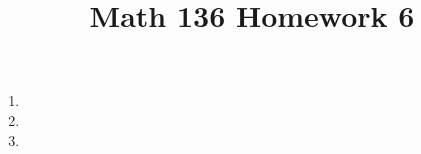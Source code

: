\documentclass{article}
\title{Math 136 Homework 6}
\begin{document}
    \maketitle
    \begin{enumerate}
      \item 
      \item 
      \item 
    \end{enumerate}
\end{document}
